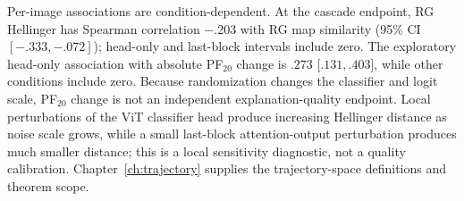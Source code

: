 Per-image associations are condition-dependent. At the cascade endpoint, RG Hellinger has Spearman correlation $-.203$ with RG map similarity (95\% CI $[-.333,-.072]$); head-only and last-block intervals include zero. The exploratory head-only association with absolute PF$_{20}$ change is $.273$ [$ .131,.403$], while other conditions include zero. Because randomization changes the classifier and logit scale, PF$_{20}$ change is not an independent explanation-quality endpoint. Local perturbations of the ViT classifier head produce increasing Hellinger distance as noise scale grows, while a small last-block attention-output perturbation produces much smaller distance; this is a local sensitivity diagnostic, not a quality calibration. Chapter~\ref{ch:trajectory} supplies the trajectory-space definitions and theorem scope.

\begin{table}[!ht]
\centering\scriptsize\setlength{\tabcolsep}{2pt}
\resizebox{\linewidth}{!}{}
\caption[Prediction audit for ViT randomization controls]{Prediction audit for the checkpoint-aligned ViT randomization controls ($n=200$ fixed test images).}
\label{tab:rebuttal-vit-prediction}
\end{table}

\begin{table}[!ht]
\centering\small\setlength{\tabcolsep}{3pt}

\caption[ViT map and trajectory diagnostics]{Checkpoint-aligned ViT map and trajectory diagnostics ($n=200$), transposed by diagnostic for legibility. Spearman associations are exploratory and unadjusted.}
\label{tab:rebuttal-vit-randomization}
\end{table}

\begin{table}[!ht]
\centering\small

\caption[Local Hellinger response to ViT perturbations]{Local Hellinger response to controlled ViT weight perturbations.}
\label{tab:rebuttal-local-hellinger}
\end{table}

